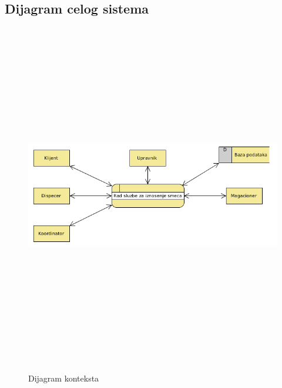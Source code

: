 \documentclass[10 pt]{article}
\begin{document}
\subsection{Dijagram celog sistema}
	\begin{figure}[H]
		\centering
		\includegraphics[width=15cm,height=15cm,keepaspectratio]{slike/DijagramKonteksta}\\
		\caption{Dijagram konteksta	\label{fig:dijagramKonteksta}}
	\end{figure}
	
\end{document}
